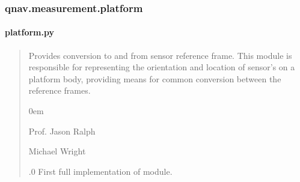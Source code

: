 \documentclass[letterpaper,10pt,english]{sphinxmanual}
\begin{document}
\sphinxstepscope


\subsubsection{qnav.measurement.platform}
\label{\detokenize{modules/measurement/platform:module-qnav.measurement.platform}}\label{\detokenize{modules/measurement/platform:qnav-measurement-platform}}\label{\detokenize{modules/measurement/platform::doc}}

\paragraph{platform.py}
\label{\detokenize{modules/measurement/platform:platform-py}}\begin{quote}\begin{description}
\sphinxAtStartPar
Provides conversion to and from sensor reference frame.
This module is responsible for representing the orientation and location
of sensor’s on a platform body, providing means for common conversion
between the reference frames.

\begin{DUlineblock}{0em}
\item[] Prof. Jason Ralph \sphinxhyphen{} 
\item[] Michael Wright \sphinxhyphen{} 
\end{DUlineblock}

.0 \sphinxhyphen{} First full implementation of module.

\end{description}\end{quote}
\end{document}
